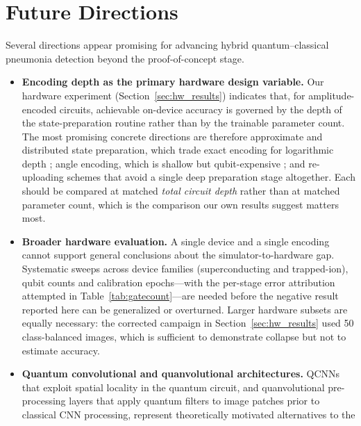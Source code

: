 \documentclass[11pt,a4paper]{article}
\begin{document}
\section{Future Directions}
\label{sec:future}

Several directions appear promising for advancing hybrid quantum--classical
pneumonia detection beyond the proof-of-concept stage.

\begin{itemize}[leftmargin=1.4em]
  \item \textbf{Encoding depth as the primary hardware design variable.}  Our
    hardware experiment (Section~\ref{sec:hw_results}) indicates that, for
    amplitude-encoded circuits, achievable on-device accuracy is governed by
    the depth of the state-preparation routine rather than by the trainable
    parameter count.  The most promising concrete directions are therefore
    approximate and distributed state preparation, which trade exact encoding
    for logarithmic depth \cite{aaronson2015}; angle encoding, which is shallow
    but qubit-expensive \cite{qkernel2022}; and re-uploading schemes that
    avoid a single deep preparation stage altogether.  Each should be compared
    at matched \emph{total circuit depth} rather than at matched parameter
    count, which is the comparison our own results suggest matters most.
  \item \textbf{Broader hardware evaluation.}  A single device and a single
    encoding cannot support general conclusions about the simulator-to-hardware
    gap.  Systematic sweeps across device families (superconducting and
    trapped-ion), qubit counts and calibration epochs---with the per-stage
    error attribution attempted in Table~\ref{tab:gatecount}---are needed
    before the negative result reported here can be generalized or overturned.
    Larger hardware subsets are equally necessary: the corrected campaign in
    Section~\ref{sec:hw_results} used 50 class-balanced images, which is
    sufficient to demonstrate collapse but not to estimate accuracy.
  \item \textbf{Quantum convolutional and quanvolutional architectures.}
    QCNNs \cite{cong2019,wei2022} that exploit spatial locality in the quantum
    circuit, and quanvolutional pre-processing layers \cite{henderson2020quanvolutional}
    that apply quantum filters to image patches prior to classical CNN
    processing, represent theoretically motivated alternatives to the

\end{itemize}
\end{document}
